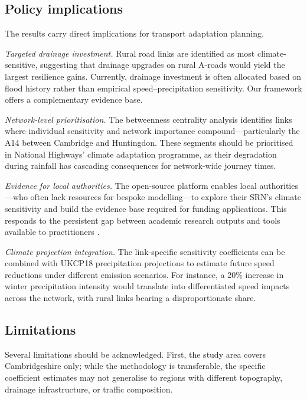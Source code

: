 \documentclass[review]{elsarticle}
\begin{document}
\subsection{Policy implications}
\label{sec:disc:policy}

The results carry direct implications for transport adaptation planning.

\textit{Targeted drainage investment.} Rural road links are identified as most climate-sensitive, suggesting that drainage upgrades on rural A-roads would yield the largest resilience gains. Currently, drainage investment is often allocated based on flood history rather than empirical speed--precipitation sensitivity. Our framework offers a complementary evidence base.

\textit{Network-level prioritisation.} The betweenness centrality analysis identifies links where individual sensitivity and network importance compound---particularly the A14 between Cambridge and Huntingdon. These segments should be prioritised in National Highways' climate adaptation programme, as their degradation during rainfall has cascading consequences for network-wide journey times.

\textit{Evidence for local authorities.} The open-source platform enables local authorities---who often lack resources for bespoke modelling---to explore their SRN's climate sensitivity and build the evidence base required for funding applications. This responds to the persistent gap between academic research outputs and tools available to practitioners \citep{unece2024stress,dft2024rea}.

\textit{Climate projection integration.} The link-specific sensitivity coefficients can be combined with UKCP18 precipitation projections \citep{ukcp18} to estimate future speed reductions under different emission scenarios. For instance, a 20\% increase in winter precipitation intensity would translate into differentiated speed impacts across the network, with rural links bearing a disproportionate share.

\subsection{Limitations}
\label{sec:disc:limits}

Several limitations should be acknowledged. First, the study area covers Cambridgeshire only; while the methodology is transferable, the specific coefficient estimates may not generalise to regions with different topography, drainage infrastructure, or traffic composition.
\end{document}
